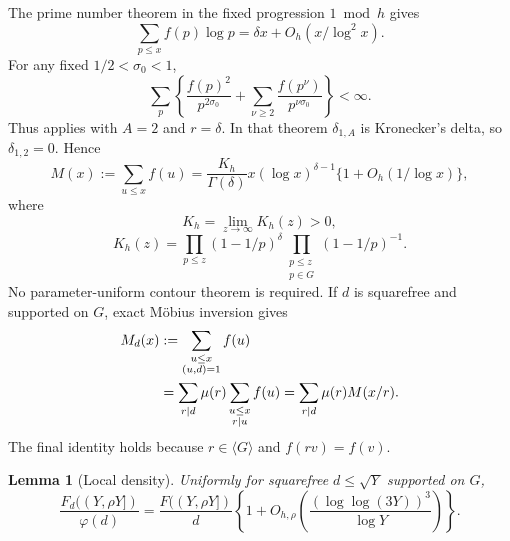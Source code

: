 \documentclass[10pt]{amsart}
\numberwithin{equation}{section}
\newcommand{\Gsem}{\langle G\rangle}
\newtheorem{lemma}[theorem]{Lemma}
\theoremstyle{remark}
\begin{document}
The prime number theorem in the fixed progression \(1\bmod h\) gives
\[
 \sum_{p\le x}f(p)\log p=\delta x+O_h(x/\log^2x).
\]
For any fixed \(1/2<\sigma_0<1\),
\[
 \sum_p\left\{
 \frac{f(p)^2}{p^{2\sigma_0}}
 +\sum_{\nu\ge2}\frac{f(p^\nu)}{p^{\nu\sigma_0}}
 \right\}<\infty.
\]
Thus \cite[Theorem 2.1]{BretècheTenenbaum} applies with \(A=2\) and
\(r=\delta\). In that theorem \(\delta_{1,A}\) is Kronecker's delta, so
\(\delta_{1,2}=0\). Hence
\begin{equation}\label{eq:M-asymp}
 M(x):=\sum_{u\le x}f(u)
 =\frac{K_h}{\Gamma(\delta)}x(\log x)^{\delta-1}
 \{1+O_h(1/\log x)\},
\end{equation}
where
\[
 K_h=\lim_{z\to\infty}K_h(z)>0,
\]
\begin{equation}\label{eq:Kh}
 K_h(z)=
 \prod_{p\le z}(1-1/p)^\delta
 \prod_{\substack{p\le z\\p\in G}}(1-1/p)^{-1}.
\end{equation}
No parameter-uniform contour theorem is required. If \(d\) is squarefree
and supported on \(G\), exact M\"obius inversion gives
\begin{align}
 M_d(x)
 &:=
 \sum_{\substack{u\le x\\(u,d)=1}}f(u) \notag\\
 &=
 \sum_{r\mid d}\mu(r)\sum_{\substack{u\le x\\r\mid u}}f(u)
 =
 \sum_{r\mid d}\mu(r)M(x/r).
\label{eq:mobius}
\end{align}
The final identity holds because \(r\in\Gsem\) and \(f(rv)=f(v)\).

\begin{lemma}[Local density]\label{lem:local-density}
Uniformly for squarefree \(d\le\sqrt Y\) supported on \(G\),
\begin{equation}\label{eq:local-density}
 \frac{F_d((Y,\rho Y])}{\varphi(d)}
 =
 \frac{F((Y,\rho Y])}{d}
 \left\{1+O_{h,\rho}\left(
 \frac{(\log\log(3Y))^3}{\log Y}\right)\right\}.
\end{equation}
\end{lemma}
\end{document}
